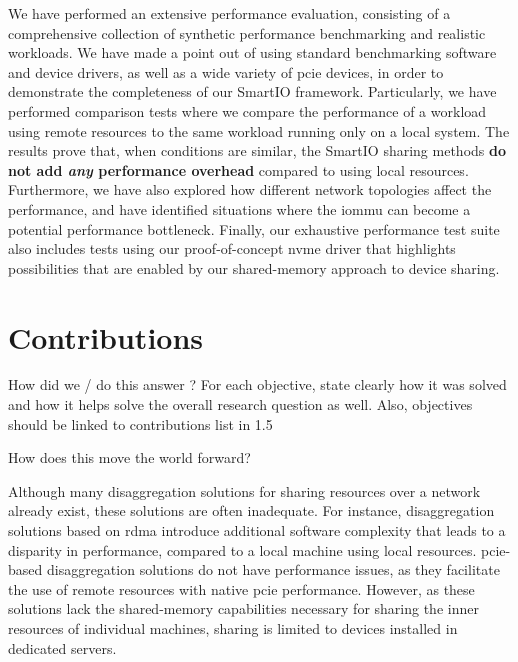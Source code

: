 We have performed an extensive performance evaluation, consisting of a comprehensive collection of synthetic performance benchmarking and realistic workloads.
%
We have made a point out of using standard benchmarking software and device drivers, as well as a wide variety of \gls{pcie} devices, in order to demonstrate the completeness of our SmartIO framework.
%
Particularly, we have performed comparison tests where we compare the performance of a workload using remote resources to the same workload running only on a local system.
%
The results prove that, when conditions are similar, the SmartIO sharing methods \textbf{do not add \emph{any} performance overhead} compared to using local resources.
%
Furthermore, we have also explored how different network topologies affect the performance, and have identified situations where the \gls{iommu} can become a potential performance bottleneck.
%
Finally, our exhaustive performance test suite also includes tests using our proof-of-concept \gls{nvme} driver that highlights possibilities that are enabled by our shared-memory approach to device sharing.






\section{Contributions}\label{sec:concl}

How did we / do this answer ?
For each objective, state clearly how it was solved and how it helps solve the overall research question as well.
%
Also, objectives should be linked to contributions list in 1.5

How does this move the world forward?




Although many \gls{disaggregation} solutions for sharing resources over a network already exist, these solutions are often inadequate. 
%
For instance, \gls{disaggregation} solutions based on \gls{rdma} introduce additional software complexity that leads to a disparity in performance, compared to a local machine using local resources. 
%
\Gls{pcie}-based \gls{disaggregation} solutions do not have performance issues, as they facilitate the use of remote resources with native \gls{pcie} performance.
%
However, as these solutions lack the shared-memory capabilities necessary for sharing the inner resources of individual machines, sharing is limited to devices installed in dedicated servers.



